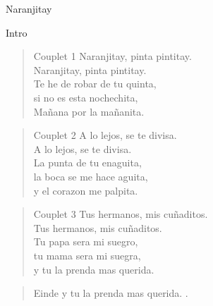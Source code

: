 \begin{song}[huayno]{Naranjitay}

\begin{instrumental}{Intro}
\measure{}\measure{}\measure{}\measure{}\measure{}\measure{}
\measure{}\measure{}
\end{instrumental}


\begin{verse}{Couplet 1}
Naranjitay, pinta pintitay.\\
Naranjitay, pinta pintitay.\\
Te he de robar de tu quinta,\\
si no es esta nochechita,\\
Mañana por la mañanita.\phantom{xxxx}
\end{verse}


\begin{verse}{Couplet 2}
A lo lejos, se te divisa.\\
A lo lejos, se te divisa.\\
La punta de tu enaguita,\\
la boca se me hace aguita,\\
y el corazon me palpita.\phantom{xxxx}
\end{verse}


\begin{verse}{Couplet 3}
Tus hermanos, mis cuñaditos. \\
Tus hermanos, mis cuñaditos. \\
Tu papa sera mi suegro,\\
tu mama sera mi suegra,\\
y tu la prenda mas querida.
\end{verse}

\begin{verse}{Einde}
y tu la prenda mas querida. \hspace{3em} \hspace{\wlskip} \hspace{\wlskip} \hspace{1em}.
\end{verse}
\end{song} 


